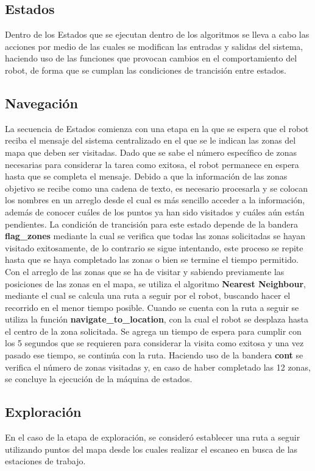 \subsection{Estados}
Dentro de los Estados que se ejecutan dentro de los algoritmos se lleva a cabo las acciones por medio de las cuales se modifican las entradas y salidas del sistema, haciendo uso de las funciones que provocan cambios en el comportamiento del robot, de forma que se cumplan las condiciones de trancisión entre estados.

\subsection{Navegación}
La secuencia de Estados comienza con una etapa en la que se espera que el robot reciba el mensaje del sistema centralizado en el que se le indican las zonas del mapa que deben ser visitadas. Dado que se sabe el número específico de zonas necesarias para considerar la tarea como exitosa, el robot permanece en espera hasta que se completa el mensaje. 
Debido a que la información de las zonas objetivo se recibe como una cadena de texto, es necesario procesarla y se colocan los nombres en un arreglo desde el cual es más sencillo acceder a la información, además de conocer cuáles de los puntos ya han sido visitados y cuáles aún están pendientes. 
La condición de trancisión para este estado depende de la bandera \textbf{flag\_zones} mediante la cual se verifica que todas las zonas solicitadas se hayan visitado exitosamente, de lo contrario se sigue intentando, este proceso se repite hasta que se haya completado las zonas o bien se termine el tiempo permitido.
Con el arreglo de las zonas que se ha de visitar y sabiendo previamente las posiciones de las zonas en el mapa, se utiliza el algoritmo \textbf{Nearest Neighbour}, mediante el cual se calcula una ruta a seguir por el robot, buscando hacer el recorrido en el menor tiempo posible.
Cuando se cuenta con la ruta a seguir se utiliza la función \textbf{navigate\_to\_location}, con la cual el robot se desplaza hasta el centro de la zona solicitada. Se agrega un tiempo de espera para cumplir con los 5 segundos que se requieren para considerar la visita como exitosa y una vez pasado ese tiempo, se continúa con la ruta. Haciendo uso de la bandera \textbf{cont} se verifica el número de zonas visitadas y, en caso de haber completado las 12 zonas, se concluye la ejecución de la máquina de estados. 

\subsection{Exploración}
En el caso de la etapa de exploración, se consideró establecer una ruta a seguir utilizando puntos del mapa desde los cuales realizar el escaneo en busca de las estaciones de trabajo.

